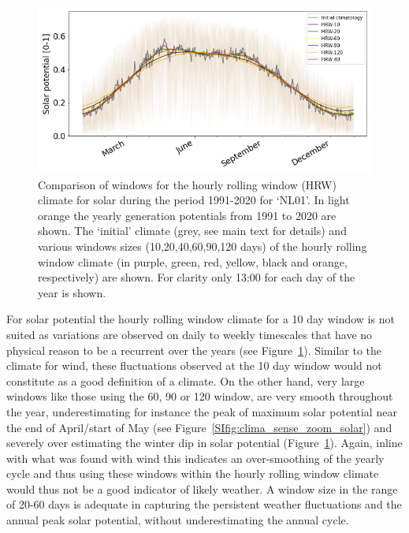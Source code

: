 \documentclass[a4paper,11pt]{extarticle}
\begin{document}
\begin{figure}[b]
    \centering
    \includegraphics[width=\textwidth]{Climatology_sensitivity_solar}
    \caption{Comparison of windows for the hourly rolling window (HRW) climate for solar during the period 1991-2020 for `NL01'. In light orange the yearly generation potentials from 1991 to 2020 are shown. The `initial' climate (grey, see main text for details) and various windows sizes (10,20,40,60,90,120 days) of the hourly rolling window climate (in purple, green, red, yellow, black and orange, respectively) are shown. For clarity only 13:00 for each day of the year is shown.}
    \label{SIfig:clima_sense_solar}
\end{figure}

For solar potential the hourly rolling window climate for a 10 day window is not suited as variations are observed on daily to weekly timescales that have no physical reason to be a recurrent over the years (see Figure~\ref{SIfig:clima_sense_solar}). Similar to the climate for wind, these fluctuations observed at the 10 day window would not constitute as a good definition of a climate. On the other hand, very large windows like those using the 60, 90 or 120 window, are very smooth throughout the year, underestimating for instance the peak of maximum solar potential near the end of April/start of May (see Figure~\ref{SIfig:clima_sense_zoom_solar}) and severely over estimating the winter dip in solar potential (Figure~\ref{SIfig:clima_sense_solar}). Again, inline with what was found with wind this indicates an over-smoothing of the yearly cycle and thus using these windows within the hourly rolling window climate would thus not be a good indicator of likely weather. A window size in the range of 20-60 days is adequate in capturing the persistent weather fluctuations and the annual peak solar potential, without underestimating the annual cycle.
\end{document}
